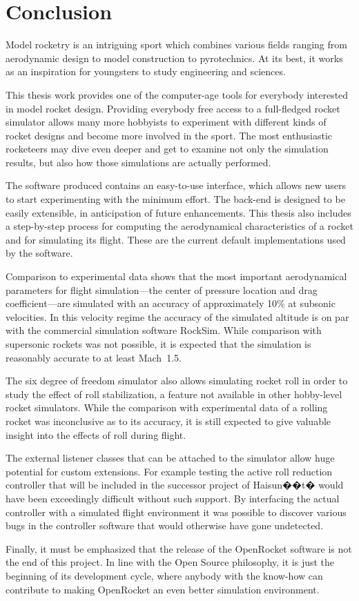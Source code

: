 

\chapter{Conclusion}
\label{chap-conclusion}


Model rocketry is an intriguing sport which combines various fields
ranging from aerodynamic design to model construction to
pyrotechnics.  At its best, it works as an inspiration for youngsters
to study engineering and sciences.

This thesis work provides one of the computer-age tools for everybody
interested in model rocket design.  Providing everybody free access to
a full-fledged rocket simulator allows many more hobbyists to
experiment with different kinds of rocket designs and become more
involved in the sport.  The most enthusiastic rocketeers may dive
even deeper and get to examine not only the simulation results, but
also how those simulations are actually performed.

The software produced contains an easy-to-use interface, which allows
new users to start experimenting with the minimum effort.  The
back-end is designed to be easily extensible, in anticipation of
future enhancements.  This thesis also includes a step-by-step process
for computing the aerodynamical characteristics of a rocket and for
simulating its flight.  These are the current default implementations
used by the software.

Comparison to experimental data shows that the most important
aerodynamical parameters for flight simulation---the center of
pressure location and drag coefficient---are simulated with an
accuracy of approximately 10\% at subsonic velocities.  In this
velocity regime the accuracy of the simulated altitude is on par with
the commercial simulation software RockSim.  While comparison with
supersonic rockets was not possible, it is expected that the
simulation is reasonably accurate to at least Mach~1.5.

The six degree of freedom simulator also allows simulating rocket roll
in order to study the effect of roll stabilization, a feature
not available in other hobby-level rocket simulators.  While the
comparison with experimental data of a rolling rocket was
inconclusive as to its accuracy, it is still expected to give valuable
insight into the effects of roll during flight.

The external listener classes that can be attached to the simulator
allow huge potential for custom extensions.  For example testing the
active roll reduction controller that will be included in the
successor project of Haisun��t� would have been exceedingly difficult
without such support.  By interfacing the actual controller with a
simulated flight environment it was possible to discover various bugs
in the controller software that would otherwise have gone undetected.

Finally, it must be emphasized that the release of the OpenRocket
software is not the end of this project.  In line with the Open Source
philosophy, it is just the beginning of its development cycle,
where anybody with the know-how can contribute to making OpenRocket an
even better simulation environment.




